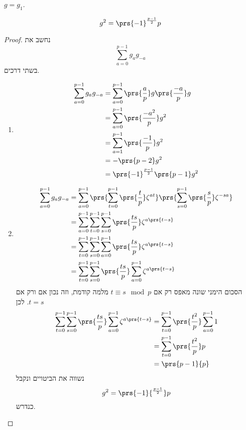 \documentclass[a4paper,10pt,twoside,openany]{book}
\begin{document}
\begin{notation}
$g = g_1$.
\end{notation}

\begin{theorem}
\[g^2 = \prs{-1}^{\frac{p-1}{2}} p\]
\end{theorem}
\begin{proof}
נחשב את
\[\sum_{a=0}^{p-1} g_a g_{-a}\]
בשתי דרכים.

\begin{enumerate}
\item \begin{align*}
\sum_{a=0}^{p-1} g_a g_{-a} &= \sum_{a=0}^{p-1} \prs{\frac{a}{p}} g \prs{\frac{-a}{p}} g \\&= \sum_{a=0}^{p-1} \prs{\frac{-a^2}{p}} g^2 \\&=
\sum_{a=1}^{p-1} \prs{\frac{-1}{p}}g^2 \\&= -\prs{p-2}g^2 \\
&= \prs{-1}^{\frac{p-1}{2}} \prs{p-1} g^2
\end{align*}
\item
\begin{align*}
\sum_{a=0}^{p-1} g_a g_{-a} &= \sum_{a=0}^{p-1} \prs{\sum_{t=0}^{p-1} \prs{\frac{t}{p}} \zeta^{at}} \prs{\sum_{s=0}^{p-1} \prs{\frac{s}{p}} \zeta^{-sa}} \\&=
\sum_{a=0}^{p-1} \sum_{t=0}^{p-1} \sum_{s=0}^{p-1} \prs{\frac{ts}{p}} \zeta^{a\prs{t-s}} \\&=
\sum_{t=0}^{p-1} \sum_{s=0}^{p-1} \sum_{a=0}^{p-1} \prs{\frac{ts}{p}} \zeta^{a\prs{t-s}} \\&=
\sum_{t=0}^{p-1} \sum_{s=0}^{p-1} \prs{\frac{ts}{p}} \sum_{a=0}^{p-1} \zeta^{a\prs{t-s}}
\end{align*}
הסכום הימני שונה מאפס רק אם
$t\equiv s \mod{p}$
מלמה קודמת, וזה נכון אם ורק אם
$t=s$.
לכן
\begin{align*}
\sum_{t=0}^{p-1} \sum_{s=0}^{p-1} \prs{\frac{ts}{p}} \sum_{a=0}^{p-1} \zeta^{a\prs{t-s}} &=
\sum_{t=0}^{p-1} \prs{\frac{t^2}{p}} \sum_{a=0}^{p-1} 1 \\&=
\sum_{t=0}^{p-1} \prs{\frac{t^2}{p}}p \\&= \prs{p-1}{p}
\end{align*}
נשווה את הביטויים ונקבל
\[g^2 = \prs{-1}{^\frac{p-1}{2}} p\]
כנדרש.
\end{enumerate}

\end{proof}

\end{document}
